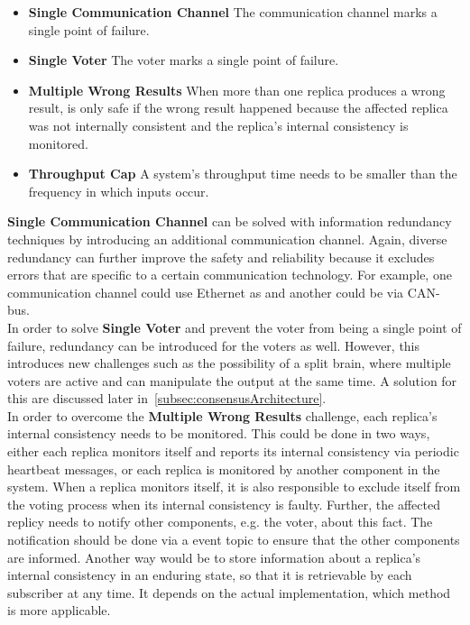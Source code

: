 \newcommand{\ChallengeWR}{\textbf{Multiple Wrong Results}\xspace}
\newcommand{\ChallengeVoter}{\textbf{Single Voter}\xspace}
\newcommand{\ChallengeComm}{\textbf{Single Communication Channel}\xspace}
\newcommand{\ChallengeThrough}{\textbf{Throughput Cap}\xspace}
\begin{itemize}
\item \ChallengeComm The communication channel marks a single point of failure.
\item \ChallengeVoter The voter marks a single point of failure.
\item \ChallengeWR When more than one replica produces a wrong result,  is only safe if the wrong result happened because the affected replica was not internally consistent and the replica's internal consistency is monitored.
\item \ChallengeThrough A system's throughput time needs to be smaller than the frequency in which inputs occur.
\end{itemize}

\ChallengeComm can be solved with information redundancy techniques by introducing an additional communication channel.
Again, diverse redundancy can further improve the safety and reliability because it excludes errors that are specific to a certain communication technology.
For example, one communication channel could use Ethernet as and another could be via CAN-bus.
\\

In order to solve \ChallengeVoter and prevent the voter from being a single point of failure, redundancy can be introduced for the voters as well.
However, this introduces new challenges such as the possibility of a split brain, where multiple voters are active and can manipulate the output at the same time.
A solution for this are discussed later in~\autoref{subsec:consensusArchitecture}.
\\

In order to overcome the \ChallengeWR challenge, each replica's internal consistency needs to be monitored.
This could be done in two ways, either each replica monitors itself and reports its internal consistency via periodic heartbeat messages, or each replica is monitored by another component in the system.
When a replica monitors itself, it is also responsible to exclude itself from the voting process when its internal consistency is faulty.
Further, the affected replicy needs to notify other components, e.g. the voter, about this fact.
The notification should be done via a  event topic to ensure that the other components are informed.
Another way would be to store information about a replica's internal consistency in an enduring  state, so that it is retrievable by each subscriber at any time.
It depends on the actual implementation, which method is more applicable.
\\


